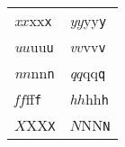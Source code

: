 \documentclass[20pt]{rntz}
\begin{document}
\Huge

\begin{tabular}{ll}
  \emph{x}$x$x\textsf{x}\texttt{x} & \emph{y}$y$y\textsf{y}\texttt{y}
  \\
  \emph{u}$u$u\textsf{u}\texttt{u} & \emph{v}$v$v\textsf{v}\texttt{v}
  \\
  \emph{n}$n$n\textsf{n}\texttt{n} & \emph{q}$q$q\textsf{q}\texttt{q}
  \\
  \emph{f}$f$f\textsf{f}\texttt{f} &
  \emph{h}$h$h\textsf{h}\texttt{h}
  \\
  $X$X\textsf{X}\texttt{X} & $N$N\textsf{N}\texttt{N}
\end{tabular}
\end{document}
